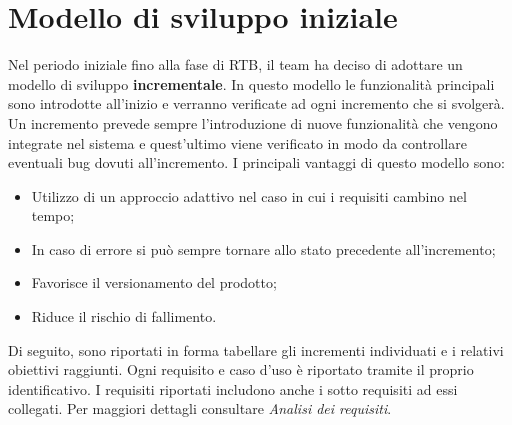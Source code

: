\section{Modello di sviluppo iniziale}
Nel periodo iniziale fino alla fase di RTB, il team ha deciso di adottare un modello di sviluppo \textbf{incrementale}. In questo
modello le funzionalità principali sono introdotte all'inizio e verranno verificate 
ad ogni incremento che si svolgerà. Un incremento prevede sempre l'introduzione di nuove
funzionalità che vengono integrate nel sistema e quest'ultimo viene verificato in modo da
controllare eventuali bug dovuti all'incremento. I principali vantaggi di questo modello sono:
\begin{itemize}
    \item Utilizzo di un approccio adattivo nel caso in cui i requisiti cambino nel tempo;
    \item In caso di errore si può sempre tornare allo stato precedente all'incremento;
    \item Favorisce il versionamento del prodotto;
    \item Riduce il rischio di fallimento.
\end{itemize} 
Di seguito, sono riportati in forma tabellare gli incrementi individuati e i relativi obiettivi raggiunti. Ogni requisito
e caso d'uso è riportato tramite il proprio identificativo. I requisiti riportati includono anche i sotto requisiti ad essi collegati.
Per maggiori dettagli consultare \textit{Analisi dei requisiti}.

\renewcommand{\arraystretch}{1.8}

